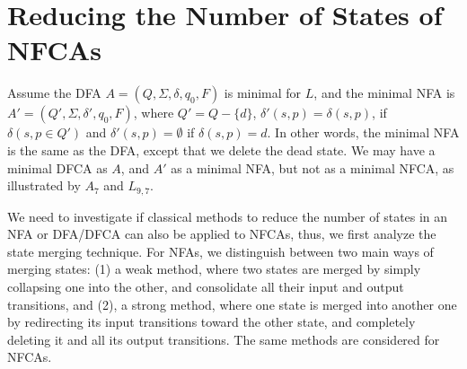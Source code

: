 \documentclass[submission,copyright,creativecommons]{eptcs}
\begin{document}
\section{Reducing the Number of States of NFCAs}
\label{sheuristic}

Assume the DFA $A=(Q,\Sigma,\delta,q_0,F)$ is minimal for $L$, and the minimal NFA is
$A'=(Q',\Sigma,\delta',q_0,F)$, 
where $Q'=Q-\{d\}$, $\delta'(s,p)=\delta(s,p)$, if $\delta(s,p\in Q')$ and $\delta'(s,p)=\emptyset$ if $\delta(s,p)=d$.
In other words, the minimal NFA is the same as the DFA, except that we delete the dead state.
We may have a minimal DFCA as $A$, and $A'$ as a minimal NFA, but not as a minimal NFCA,  as illustrated by
$A_7$ and $L_{9,7}$.

We need to investigate if classical methods to reduce the number of states in an NFA or DFA/DFCA
can also be applied to NFCAs, thus, we first analyze the state  merging technique.
For NFAs,  we distinguish between  two main ways of merging states: (1) a weak method,
where two states are merged by simply collapsing one into the other, and consolidate
all their input and output transitions, and (2), a strong method, where one state is
merged into another one by redirecting its input transitions toward the other state,
and completely deleting it and all its output transitions. 
The same methods are considered for NFCAs.
\end{document}
